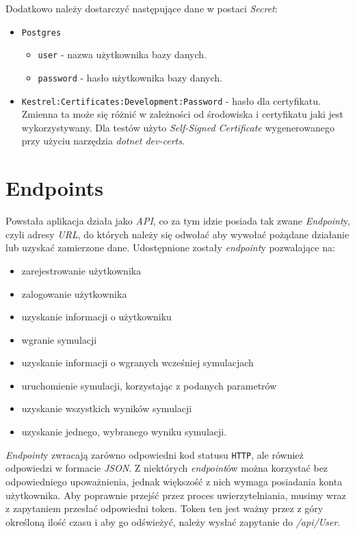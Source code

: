 \par Dodatkowo należy dostarczyć następujące dane w postaci \emph{\dotnet{} Secret}:
\begin{itemize}
	\item \texttt{Postgres}
	\begin{itemize}
		\item \texttt{user} - nazwa użytkownika bazy danych.
		\item \texttt{password} - hasło użytkownika bazy danych.
	\end{itemize}
	\item \texttt{Kestrel:Certificates:Development:Password} - hasło dla certyfikatu. Zmienna ta może się różnić w zależności od środowiska i certyfikatu jaki jest wykorzystywany. Dla testów użyto \emph{Self-Signed Certificate} wygenerowanego przy użyciu narzędzia \emph{dotnet dev-certs}.
\end{itemize}

\section{Endpoints}

\par Powstała aplikacja działa jako \emph{API}, co za tym idzie posiada tak zwane \emph{Endpoint}y, czyli adresy \emph{URL}, do których należy się odwołać aby wywołać pożądane działanie lub uzyskać zamierzone dane. Udostępnione zostały \emph{endpoint}y pozwalające na:
\begin{itemize}
	\item zarejestrowanie użytkownika
	\item zalogowanie użytkownika
	\item uzyskanie informacji o użytkowniku
	\item wgranie symulacji
	\item uzyskanie informacji o wgranych wcześniej symulacjach
	\item uruchomienie symulacji, korzystając z podanych parametrów
	\item uzyskanie wszystkich wyników symulacji
	\item uzyskanie jednego, wybranego wyniku symulacji.
\end{itemize}

\par \emph{Endpoint}y zwracają zarówno odpowiedni kod statusu \texttt{HTTP}, ale również odpowiedzi w formacie \emph{JSON}. Z niektórych \emph{endpoint}ów można korzystać bez odpowiedniego upoważnienia, jednak większość z nich wymaga posiadania konta użytkownika. Aby poprawnie przejść przez proces uwierzytelniania, musimy wraz z zapytaniem przesłać odpowiedni token. Token ten jest ważny przez z góry określoną ilość czasu i aby go odświeżyć, należy wysłać zapytanie do \emph{/api/User}.

